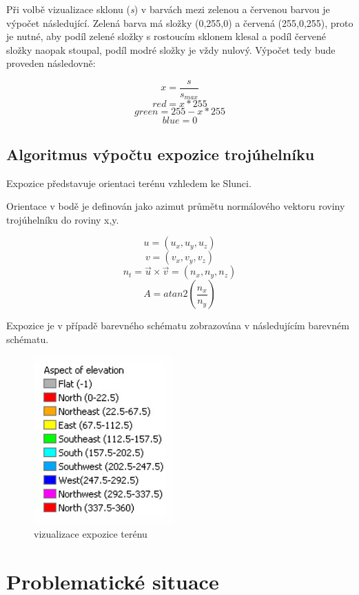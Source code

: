 \documentclass[11pt]{article}
\begin{document}
Při volbě vizualizace sklonu (\textit{s}) v barvách mezi zelenou a červenou barvou je výpočet následující. Zelená barva má složky (0,255,0) a červená (255,0,255), proto je nutné, aby podíl zelené složky s rostoucím sklonem klesal a podíl červené složky naopak stoupal, podíl modré složky je vždy nulový. Výpočet tedy bude proveden následovně:

$$	x = \frac{s}{s_{max}} $$
$$	red = x*255 $$
$$	green = 255-x*255 $$
$$	blue = 0 $$

\subsection{Algoritmus výpočtu expozice trojúhelníku}
Expozice představuje orientaci terénu vzhledem ke Slunci.

Orientace v bodě je definován jako azimut průmětu normálového vektoru roviny trojúhelníku do roviny x,y.

$$  u = (u_x, u_y, u_z)$$
$$  v = (v_x, v_y, v_z)$$
$$ n_t = \vec{u}\times \vec{v} = (n_x, n_y, n_z)$$
$$ A =atan2( \frac{n_x}{n_y}) $$

Expozice je v případě barevného schématu zobrazována v následujícím barevném schématu.

\begin{figure}[htbh]
	\centering
	\includegraphics[scale=1]{images/expozice.jpg} 
	\caption{vizualizace expozice terénu}
	\label{fig:getExposition()}
\end{figure} 

\clearpage

\section{Problematické situace}
	
\end{document}
